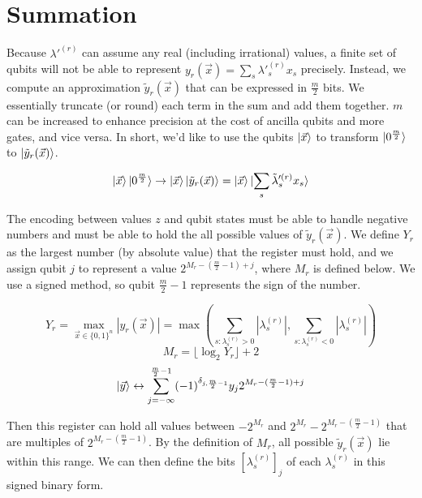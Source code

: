 \section{Summation}

Because $\lambda'^{(r)}$ can assume any real (including irrational) values, a finite set of qubits will not be able to represent $y_r(\vec{x}) = \sum_s \lambda'^{(r)}_s x_s$ precisely. Instead, we compute an approximation $\tilde{y}_r(\vec{x})$ that can be expressed in $\frac{m}{2}$ bits. We essentially truncate (or round) each term in the sum and add them together. $m$ can be increased to enhance precision at the cost of ancilla qubits and more gates, and vice versa. In short, we'd like to use the qubits $\ket{\vec{x}}$ to transform $\ket{0^{\frac{m}{2}}}$ to $\ket{\tilde{y}_r(\vec{x})}$.

\begin{equation}
    \ket{\vec{x}}\ket{0^{\frac{m}{2}}} \rightarrow \ket{\vec{x}}\ket{\tilde{y}_r(\vec{x})} = \ket{\vec{x}}\ket{\sum_s \tilde{\lambda}'^{(r)}_s x_s}
    \label{eq: summation}
\end{equation}

The encoding between values $z$ and qubit states must be able to handle negative numbers and must be able to hold the all possible values of $\tilde{y}_r(\vec{x})$. We define $Y_r$ as the largest number (by absolute value) that the register must hold, and we assign qubit $j$ to represent a value $2^{M_r - (\frac{m}{2} - 1) + j}$, where $M_r$ is defined below. We use a signed method, so qubit $\frac{m}{2} - 1$ represents the sign of the number. 

\begin{equation}
    Y_r = \max_{\vec{x} \in \{0, 1\}^n} |y_r(\vec{x})| = \max\left(\sum_{s : \lambda^{(r)}_s > 0} |\lambda^{(r)}_s|, \sum_{s : \lambda^{(r)}_s < 0} |\lambda^{(r)}_s|\right)
\end{equation}
\begin{equation}
    M_r = \lfloor \log_2{Y_r} \rfloor + 2
\end{equation}
\begin{equation}
    \ket{\vec{y}} \leftrightarrow \sum_{j = -\infty}^{\frac{m}{2} - 1} (-1)^{\delta_{j, \frac{m}{2} - 1}}y_j2^{M_r - (\frac{m}{2} - 1) + j}
\end{equation}

Then this register can hold all values between $-2^{M_r}$ and $2^{M_r} - 2^{M_r - (\frac{m}{2} - 1)}$ that are multiples of $2^{M_r - (\frac{m}{2} - 1)}$. By the definition of $M_r$, all possible $\tilde{y}_r(\vec{x})$ lie within this range. We can then define the bits $[\lambda^{(r)}_s]_j$ of each $\lambda^{(r)}_s$ in this signed binary form.

